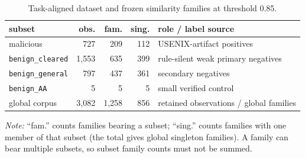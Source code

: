 \begin{table}[t]
  \centering
  \caption{Task-aligned dataset and frozen similarity families at threshold 0.85.}
  \label{tab:dataset-composition}
  \footnotesize
  \setlength{\tabcolsep}{2.3pt}
  \begin{tabular}{@{}p{1.45cm}rrrp{2.25cm}@{}}
    \toprule
    subset & obs. & fam. & sing. & role / label source \\
    \midrule
    malicious & 727 & 209 & 112 & USENIX-artifact positives \\
    \texttt{benign\_cleared} & 1,553 & 635 & 399 & rule-silent weak primary negatives \\
    \texttt{benign\_general} & 797 & 437 & 361 & secondary negatives \\
    \texttt{benign\_AA} & 5 & 5 & 5 & small verified control \\
    \midrule
    global corpus & 3,082 & 1,258 & 856 & retained observations / global families \\
    \bottomrule
  \end{tabular}
  \vspace{2pt}

  \parbox{\columnwidth}{\footnotesize \emph{Note:} ``fam.'' counts families bearing a subset; ``sing.'' counts families with one member of that subset (the total gives global singleton families). A family can bear multiple subsets, so subset family counts must not be summed.}
\end{table}
